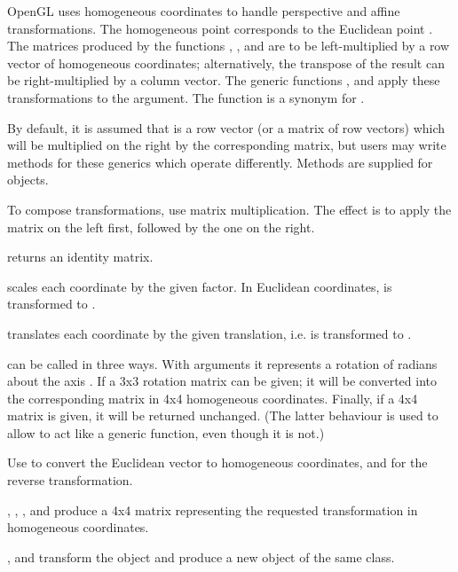 \documentclass{article}
\begin{document}
\begin{Details}\relax
OpenGL uses homogeneous coordinates to handle perspective and affine
transformations.  The homogeneous point  corresponds
to the Euclidean point .  The matrices produced by
the functions , , and 
are to be left-multiplied by a row vector 
of homogeneous coordinates; alternatively, the transpose of the result
can be right-multiplied by a column vector.  The generic functions
,  and  apply these transformations
to the  argument.  The  function is a synonym 
for .

By default, it is assumed that  is a row vector
(or a matrix of row vectors) which will be multiplied on the right by
the corresponding matrix, but users may write methods for these generics
which operate differently.  Methods are supplied for 
objects.

To compose transformations, use matrix multiplication.  The effect is
to apply the matrix on the left first, followed by the one on the right.

 returns an identity matrix.

 scales each coordinate by the given factor.  In Euclidean
coordinates,  is transformed to .

 translates each coordinate by the given translation, i.e.
 is transformed to .

 can be called in three ways.  With 
arguments  it represents a rotation 
of  radians about the axis 
.  If a 3x3 rotation matrix can be given;
it will be converted into the corresponding matrix in 4x4 homogeneous
coordinates.  Finally, if a 4x4 matrix is given, it will be returned unchanged.
(The latter behaviour is used to allow  to act like a 
generic function, even though it is not.)

Use  to convert the Euclidean vector  to
homogeneous coordinates, and  for the reverse transformation.
\end{Details}
\begin{Value}
,
, , and  produce
a 4x4 matrix representing the requested transformation
in homogeneous coordinates.  

,  and  transform the object
and produce a new object of the same class.
\end{Value}
\end{document}
